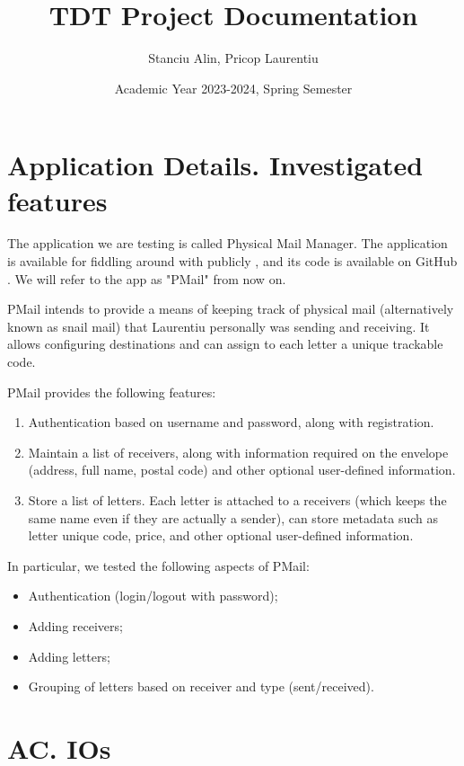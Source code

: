 \documentclass{article}
\title{TDT Project Documentation}
\author{Stanciu Alin, Pricop Laurentiu}
\date{Academic Year 2023-2024, Spring Semester}
\begin{document}

\maketitle
\tableofcontents

\newpage
{}

\section{Application Details. Investigated features}

The application we are testing is called Physical Mail Manager. The application is available for fiddling around with publicly \cite{PmailSite}, and its code is available on GitHub \cite{PmailGithub}. We will refer to the app as "PMail" from now on.

PMail intends to provide a means of keeping track of physical mail (alternatively known as snail mail) that Laurentiu personally was sending and receiving. It allows configuring destinations and can assign to each letter a unique trackable code.

PMail provides the following features:
\begin{enumerate}
    \item Authentication based on username and password, along with registration.
    \item Maintain a list of receivers, along with information required on the envelope (address, full name, postal code) and other optional user-defined information.
    \item Store a list of letters. Each letter is attached to a receivers (which keeps the same name even if they are actually a sender), can store metadata such as letter unique code, price, and other optional user-defined information.
\end{enumerate}

In particular, we tested the following aspects of PMail:
\begin{itemize}
    \item Authentication (login/logout with password);
    \item Adding receivers;
    \item Adding letters;
    \item Grouping of letters based on receiver and type (sent/received).
\end{itemize}

\section{AC. IOs}
\end{document}
